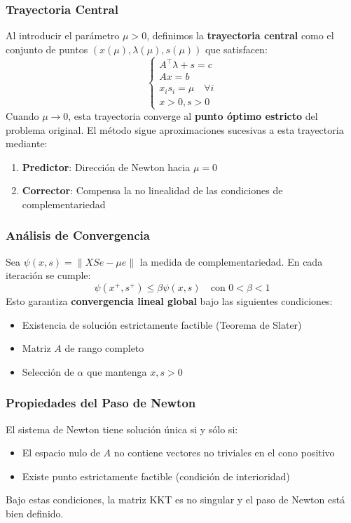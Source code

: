 \documentclass{article}
\begin{document}
\subsubsection{Trayectoria Central}
Al introducir el parámetro $\mu > 0$, definimos la \textbf{trayectoria central} como el conjunto de puntos $(x(\mu), \lambda(\mu), s(\mu))$ que satisfacen:
\[
\begin{cases}
A^\top \lambda + s = c \\
Ax = b \\
x_i s_i = \mu \quad \forall i \\
x > 0, s > 0
\end{cases}
\]
Cuando $\mu \to 0$, esta trayectoria converge al \textbf{punto óptimo estricto} del problema original. El método sigue aproximaciones sucesivas a esta trayectoria mediante:

\begin{enumerate}
\item \textbf{Predictor}: Dirección de Newton hacia $\mu=0$
\item \textbf{Corrector}: Compensa la no linealidad de las condiciones de complementariedad
\end{enumerate}

\subsubsection{Análisis de Convergencia}
Sea $\psi(x,s) = \|XSe - \mu e\|$ la medida de complementariedad. En cada iteración se cumple:
\[
\psi(x^+,s^+) \leq \beta \psi(x,s) \quad \text{con } 0 < \beta < 1
\]
Esto garantiza \textbf{convergencia lineal global} bajo las siguientes condiciones:
\begin{itemize}
\item Existencia de solución estrictamente factible (Teorema de Slater)
\item Matriz $A$ de rango completo
\item Selección de $\alpha$ que mantenga $x,s > 0$
\end{itemize}

\subsubsection{Propiedades del Paso de Newton}
El sistema de Newton tiene solución única si y sólo si:
\begin{itemize}
\item El espacio nulo de $A$ no contiene vectores no triviales en el cono positivo
\item Existe punto estrictamente factible (condición de interioridad)
\end{itemize}
Bajo estas condiciones, la matriz KKT es no singular y el paso de Newton está bien definido.
\end{document}
